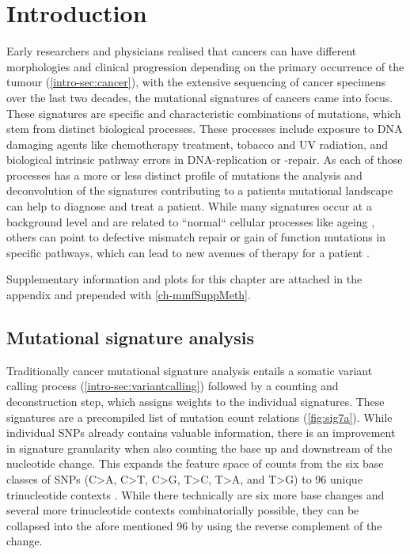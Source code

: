 \section{Introduction}
\label{mmf-sec:intro}

Early researchers and physicians realised that cancers can have different morphologies and clinical progression depending on the primary occurrence of the tumour (\autoref{intro-sec:cancer}), with the extensive sequencing of cancer specimens over the last two decades, the mutational signatures of cancers came into focus. These signatures are specific and characteristic combinations of mutations, which stem from distinct biological processes. These processes include exposure to DNA damaging agents like chemotherapy treatment, tobacco and UV radiation, and biological intrinsic pathway errors in DNA-replication or -repair. As each of those processes has a more or less distinct profile of mutations \cite{Hollstein1991,Kucab2019} the analysis and deconvolution of the signatures contributing to a patients mutational landscape can help to diagnose and treat a patient. While many signatures occur at a background level and are related to ``normal`` cellular processes like ageing \cite{Alexandrov2013}, others can point to defective mismatch repair or gain of function mutations in specific pathways, which can lead to new avenues of therapy for a patient \cite{Neil2017}.

Supplementary information and plots for this chapter are attached in the appendix and prepended with \ref{ch-mmfSuppMeth}.

\subsection{Mutational signature analysis}
\label{mmf-sec:signatureanalysis}
Traditionally cancer mutational signature analysis entails a somatic variant calling process (\autoref{intro-sec:variantcalling}) followed by a counting and deconstruction step, which assigns weights to the individual signatures. These signatures are a precompiled list of mutation count relations (\autoref{fig:sig7a}). While individual SNPs already contains valuable information, there is an improvement in signature granularity when also counting the base up and downstream of the nucleotide change. This expands the feature space of counts from the six base classes of SNPs (C>A, C>T, C>G, T>C, T>A, and T>G) to 96 unique trinucleotide contexts \cite{Alexandrov2013}. While there technically are six more base changes and several  more trinucleotide contexts combinatorially possible, they can be collapsed into the afore mentioned 96 by using the reverse complement of the change.

